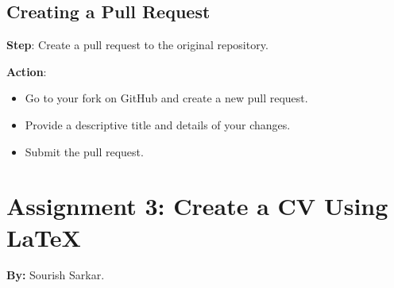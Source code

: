 \documentclass[a4paper,12pt]{article}
\begin{document}
\subsection{Creating a Pull Request}
\textbf{Step}: Create a pull request to the original repository.

\textbf{Action}:
\begin{itemize}
    \item Go to your fork on GitHub and create a new pull request.
    \item Provide a descriptive title and details of your changes.
    \item Submit the pull request.
\end{itemize}

\newpage
\section{Assignment 3: Create a CV Using LaTeX}

\textbf{By:} Sourish Sarkar.
\end{document}
